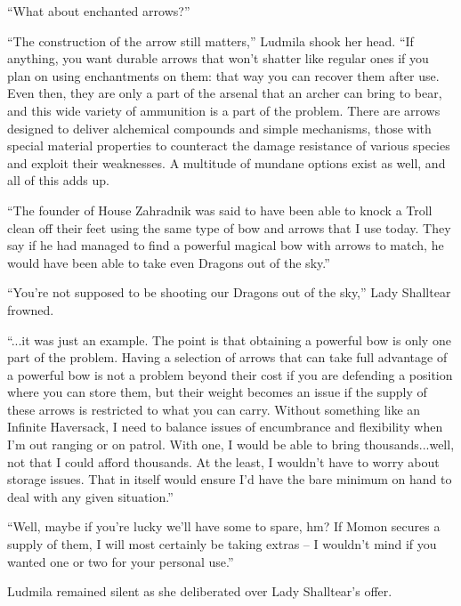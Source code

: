  

“What about enchanted arrows?”

 

“The construction of the arrow still matters,” Ludmila shook her head. “If anything, you want durable arrows that won’t shatter like regular ones if you plan on using enchantments on them: that way you can recover them after use. Even then, they are only a part of the arsenal that an archer can bring to bear, and this wide variety of ammunition is a part of the problem. There are arrows designed to deliver alchemical compounds and simple mechanisms, those with special material properties to counteract the damage resistance of various species and exploit their weaknesses. A multitude of mundane options exist as well, and all of this adds up.

 

“The founder of House Zahradnik was said to have been able to knock a Troll clean off their feet using the same type of bow and arrows that I use today. They say if he had managed to find a powerful magical bow with arrows to match, he would have been able to take even Dragons out of the sky.”

 

“You’re not supposed to be shooting our Dragons out of the sky,” Lady Shalltear frowned.

 

“...it was just an example. The point is that obtaining a powerful bow is only one part of the problem. Having a selection of arrows that can take full advantage of a powerful bow is not a problem beyond their cost if you are defending a position where you can store them, but their weight becomes an issue if the supply of these arrows is restricted to what you can carry. Without something like an Infinite Haversack, I need to balance issues of encumbrance and flexibility when I’m out ranging or on patrol. With one, I would be able to bring thousands...well, not that I could afford thousands. At the least, I wouldn’t have to worry about storage issues. That in itself would ensure I’d have the bare minimum on hand to deal with any given situation.”

 

“Well, maybe if you’re lucky we’ll have some to spare, hm? If Momon secures a supply of them, I will most certainly be taking extras – I wouldn’t mind if you wanted one or two for your personal use.”

 

Ludmila remained silent as she deliberated over Lady Shalltear’s offer.

